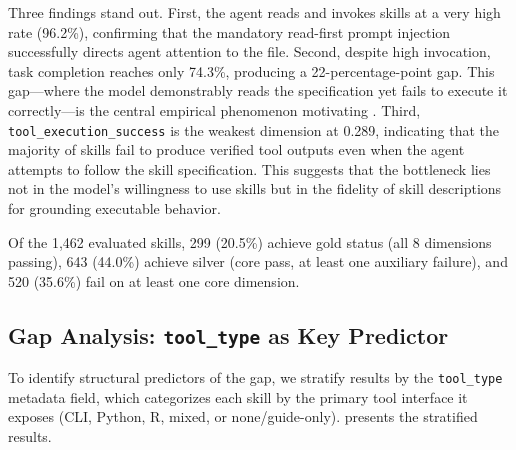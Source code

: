 Three findings stand out.
First, the agent reads and invokes skills at a very high rate (96.2\%), confirming that the mandatory read-first prompt injection successfully directs agent attention to the \skillmd file.
Second, despite high invocation, task completion reaches only 74.3\%, producing a 22-percentage-point \rbu gap.
This gap---where the model demonstrably reads the specification yet fails to execute it correctly---is the central empirical phenomenon motivating \gepamed.
Third, \texttt{tool\_execution\_success} is the weakest dimension at 0.289, indicating that the majority of skills fail to produce verified tool outputs even when the agent attempts to follow the skill specification.
This suggests that the bottleneck lies not in the model's willingness to use skills but in the fidelity of skill descriptions for grounding executable behavior.

Of the 1,462 evaluated skills, 299 (20.5\%) achieve gold status (all 8 dimensions passing), 643 (44.0\%) achieve silver (core pass, at least one auxiliary failure), and 520 (35.6\%) fail on at least one core dimension.

\subsection{\rbu Gap Analysis: \texttt{tool\_type} as Key Predictor}
\label{ssec:rbu_analysis}

To identify structural predictors of the \rbu gap, we stratify results by the \texttt{tool\_type} metadata field, which categorizes each skill by the primary tool interface it exposes (CLI, Python, R, mixed, or none/guide-only).
 presents the stratified results.

\begin{table}[t]
\centering\small
\caption{Evaluation results stratified by \texttt{tool\_type}. Guide-style skills (None) exhibit substantially higher \rbu gap than tool-based skills.}
\setlength{\tabcolsep}{3pt}
\label{tab:tool_type}
\end{table}

